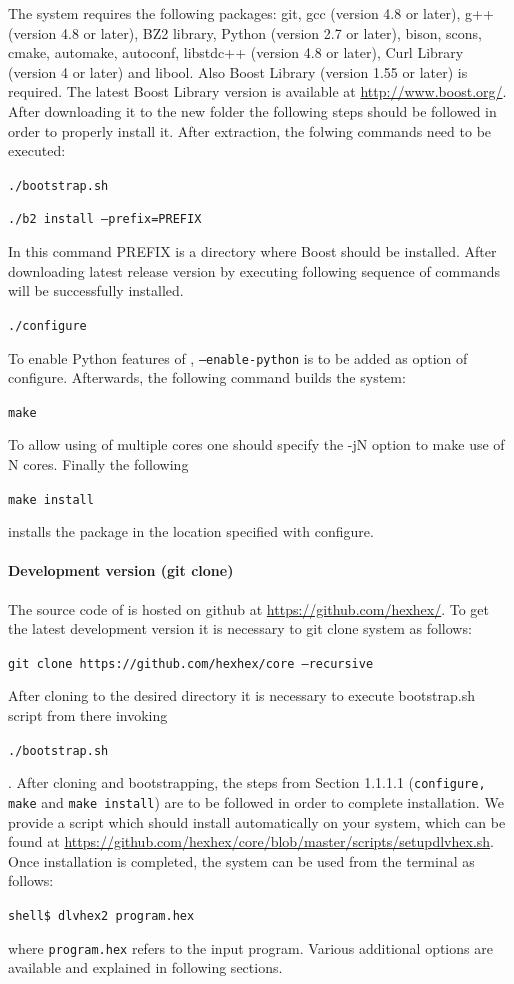 \documentclass[14pt,a4paper, titlepage]{article}
\begin{document}
The system requires the following packages: git, gcc (version 4.8 or later), g++ (version 4.8 or later), BZ2 library, Python (version 2.7 or later), bison, scons, cmake, automake, autoconf, libstdc++ (version 4.8 or later), Curl Library (version 4 or later) and libool. Also Boost Library (version 1.55 or later) is required. The latest Boost Library version is available at \url{http://www.boost.org/}. After downloading it to the new folder the following steps should be followed in order to properly install it. After extraction, the folwing commands need to be executed:
\\ \centerline{\texttt{./bootstrap.sh}}
\centerline{\texttt{./b2 install --prefix=PREFIX}} In this command PREFIX is a directory where Boost should be installed. After downloading latest release version by executing following sequence of commands \dlvhex{} will be successfully installed.
\\ \centerline{\texttt{./configure}} To enable Python features of \dlvhex{}, \texttt{--enable-python} is to be added as option of configure. Afterwards, the following command builds the system:
\\ \centerline{\texttt{make}} To allow using of multiple cores one should specify the -jN option to make use of N cores. Finally the following
\\ \centerline{\texttt{make install}} installs the package in the location specified with configure.  
   
\paragraph{Development version (git clone)}
The source code of \dlvhex{} is hosted on github at \url{https://github.com/hexhex/}. To get the latest development version it is necessary to git clone system as follows:
\\ \centerline{\texttt{git clone https://github.com/hexhex/core --recursive}} 
After cloning to the desired directory it is necessary to execute bootstrap.sh script from there invoking \\ \centerline{\texttt{./bootstrap.sh}}. 
After cloning and bootstrapping, the steps from Section 1.1.1.1 (\texttt{configure, make} and \texttt{make install}) are to be followed in order to complete installation.
We provide a script which should install \dlvhex{} automatically on your system, which can be found at \url{https://github.com/hexhex/core/blob/master/scripts/setupdlvhex.sh}.
Once installation is completed, the system can be used from the terminal as follows:\\ 
\centerline{\texttt{shell\$ dlvhex2 program.hex}} where \texttt{program.hex} refers to the input program. Various additional options are available and explained in following sections.    
\end{document}

